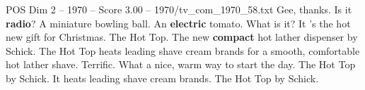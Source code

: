 \begin{textsample}{POS Dim 2 – 1970 – Score 3.00 – 1970/tv\_com\_1970\_58.txt}  \label{ex:f2_pos_051}
Gee, thanks.
Is it \textbf{radio}?
A miniature bowling ball.
An \textbf{electric} tomato.
What is it?
It 's the hot new gift for Christmas.
The Hot Top.
The new \textbf{compact} hot lather dispenser by Schick.
The Hot Top heats leading shave cream brands for a smooth, comfortable hot lather shave.
Terrific.
What a nice, warm way to start the day.
The Hot Top by Schick.
It heats leading shave cream brands.
The Hot Top by Schick.

\end{textsample}
